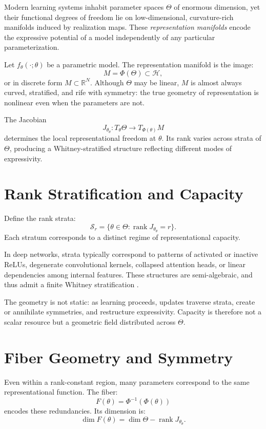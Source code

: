 \documentclass[12pt]{article}
\theoremstyle{plain}
\theoremstyle{definition}
\theoremstyle{remark}
\DeclareMathOperator{\rank}{rank}
\newcommand{\ThetaSpace}{\Theta}
\newcommand{\ModelMap}{f_\theta}
\newcommand{\ParamJac}{J_\theta}
\newcommand{\Stratum}{\mathcal{S}}
\newcommand{\Realization}{\Phi}
\begin{document}
Modern learning systems inhabit parameter spaces $\ThetaSpace$ of enormous 
dimension, yet their functional degrees of freedom lie on low-dimensional, 
curvature-rich manifolds induced by realization maps. These 
\emph{representation manifolds} encode the expressive potential of a model 
independently of any particular parameterization.

Let $\ModelMap(\cdot;\theta)$ be a parametric model. The representation 
manifold is the image:
\[
M = \Realization(\ThetaSpace) \subset \mathcal{H},
\]
or in discrete form $M \subset \mathbb{R}^N$. Although $\ThetaSpace$ may 
be linear, $M$ is almost always curved, stratified, and rife with symmetry:
the true geometry of representation is nonlinear even when the parameters are not.

The Jacobian
\[
\ParamJac_\theta : T_\theta \ThetaSpace \to T_{\Realization(\theta)} M
\]
determines the local representational freedom at $\theta$. Its rank varies 
across strata of $\ThetaSpace$, producing a Whitney-stratified structure 
reflecting different modes of expressivity.

\section{Rank Stratification and Capacity}

Define the rank strata:
\[
\Stratum_r = \{\theta \in \ThetaSpace : \rank \ParamJac_\theta = r\}.
\]
Each stratum corresponds to a distinct regime of representational capacity.

In deep networks, strata typically correspond to patterns of activated or 
inactive ReLUs, degenerate convolutional kernels, collapsed attention heads, 
or linear dependencies among internal features. These structures are 
semi-algebraic, and thus admit a finite Whitney stratification 
\citep{goresky1988stratified, mather1973stratifications}.

The geometry is not static: as learning proceeds, updates traverse strata, 
create or annihilate symmetries, and restructure expressivity. Capacity is 
therefore not a scalar resource but a geometric field distributed across $\ThetaSpace$.

\section{Fiber Geometry and Symmetry}

Even within a rank-constant region, many parameters correspond to the same 
representational function. The fiber:
\[
F(\theta) = \Realization^{-1}(\Realization(\theta))
\]
encodes these redundancies. Its dimension is:
\[
\dim F(\theta) = \dim \ThetaSpace - \rank \ParamJac_\theta.
\]
\end{document}
